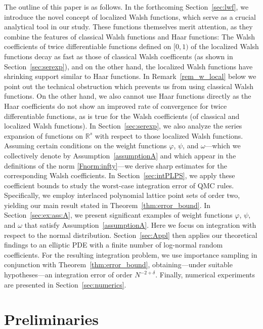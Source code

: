 \documentclass[namedate,webpdf,imanum]{ima-authoring-arxiv}%
\theoremstyle{thmstyletwo}%
\numberwithin{equation}{section}
\begin{document}
The outline of this paper is as follows. In the forthcoming Section~\ref{sec:lwf}, we introduce the novel concept of localized Walsh functions, which serve as a crucial analytical tool in our study. These functions themselves merit attention, as they combine the features of classical Walsh functions and Haar functions: The Walsh coefficients of twice differentiable functions defined on $[0,1)$ of the localized Walsh functions decay as fast as those of classical Walsh coefficents (as shown in Section~\ref{sec:serexp}), and on the other hand, the localized Walsh functions have shrinking support similar to Haar functions. In Remark~\ref{rem_w_local} below we point out the technical obstruction which prevents us from using classical Walsh functions. On the other hand, we also cannot use Haar functions directly as the Haar coefficients do not show an improved rate of convergence for twice differentiable functions, as is true for the Walsh coefficients (of classical and localized Walsh functions). In Section~\ref{sec:serexp}, we also analyze the series expansion of functions on $\mathbb{R}^s$ with respect to those localized Walsh functions. Assuming certain conditions on the weight functions $\varphi$, $\psi$, and $\omega$—which we collectively denote by Assumption~\ref{assumptionA} and which appear in the definitions of the norm \eqref{Fnorm:infty}—we derive sharp estimates for the corresponding Walsh coefficients. In Section~\ref{sec:intPLPS}, we apply these coefficient bounds to study the worst-case integration error of QMC rules. Specifically, we employ interlaced polynomial lattice point sets of order two, yielding our main result stated in Theorem~\ref{thm:error_bound}. In Section~\ref{sec:ex:ass:A}, we present significant examples of weight functions $\varphi$, $\psi$, and $\omega$ that satisfy Assumption~\ref{assumptionA}. Here we focus on integration with respect to the normal distribution. Section~\ref{sec:Appl} then applies our theoretical findings to an elliptic PDE with a finite number of log-normal random coefficients. For the resulting integration problem, we use importance sampling in conjunction with Theorem~\ref{thm:error_bound}, obtaining—under suitable hypotheses—an integration error of order $N^{-2+\delta}$. Finally, numerical experiments are presented in Section~\ref{sec:numerics}.



\section{Preliminaries}
\end{document}
